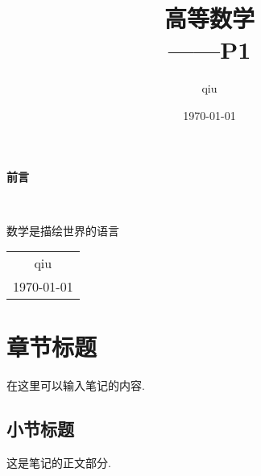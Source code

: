 \documentclass[12pt, a4paper, oneside]{ctexbook}
\title{{\Huge{\textbf{高等数学}}}\\——P1}
\author{qiu}
\date{\today}
\begin{document}
\maketitle


\setcounter{page}{1}
\begin{center}
    \Huge\textbf{前言}
\end{center}~\

数学是描绘世界的语言
~\\

\begin{flushright}
    \begin{tabular}{c}
        qiu\\
        \today
    \end{tabular}
\end{flushright}


\newpage
{}
\setcounter{page}{1}
\tableofcontents
\newpage
\setcounter{page}{1}


\chapter{章节标题}

在这里可以输入笔记的内容. 

\section{小节标题}

这是笔记的正文部分. 
\end{document}
